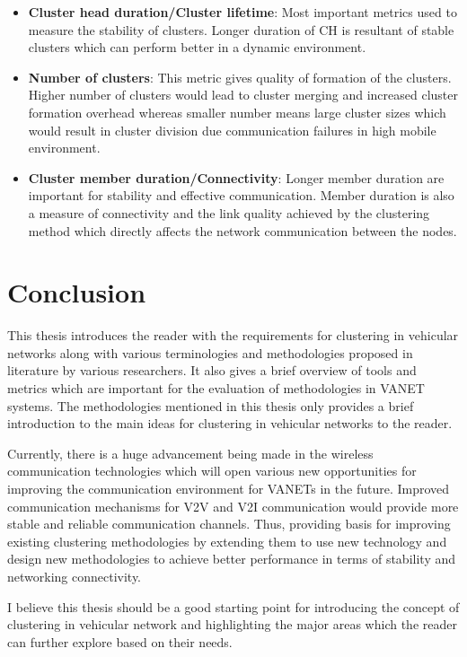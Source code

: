 \documentclass[]{ccs-thesis}
\begin{document}
\begin{itemize}
    \item \textbf{Cluster head duration/Cluster lifetime}: Most important metrics used to measure the stability of clusters.
          Longer duration of \ac{CH} is resultant of stable clusters which can perform better in a dynamic environment.
    \item \textbf{Number of clusters}: This metric gives quality of formation of the clusters. Higher number of clusters
          would lead to cluster merging and increased cluster formation overhead whereas smaller number means large cluster sizes
          which would result in cluster division due communication failures in high mobile environment.
    \item \textbf{Cluster member duration/Connectivity}: Longer member duration are important for stability and effective
          communication. Member duration is also a measure of connectivity and the link quality achieved by the clustering method
          which directly affects the network communication between the nodes.
\end{itemize}


\chapter{Conclusion}
\label{sec:conclusions}

This thesis introduces the reader with the requirements for clustering in vehicular networks along with various
terminologies and methodologies proposed in literature by various researchers. It also gives a brief overview
of tools and metrics which are important for the evaluation of methodologies in \ac{VANET} systems. The methodologies
mentioned in this thesis only provides a brief introduction to the main ideas for clustering in vehicular networks to
the reader.

Currently, there is a huge advancement being made in the wireless communication technologies which will open
various new opportunities for improving the communication environment for \ac{VANET}s in the future.
Improved communication mechanisms for \ac{V2V} and \ac{V2I} communication would provide more stable and
reliable communication channels. Thus, providing basis for improving existing clustering methodologies by
extending them to use new technology and design new methodologies to achieve better performance in terms
of stability and networking connectivity.

I believe this thesis should be a good starting point for introducing the concept of clustering in vehicular
network and highlighting the major areas which the reader can further explore based on their needs.

\cleardoublepage

\listofabbreviations
\clearpage

\listoffigures
\clearpage

\listoftables
\clearpage

\printbibliography
\end{document}
